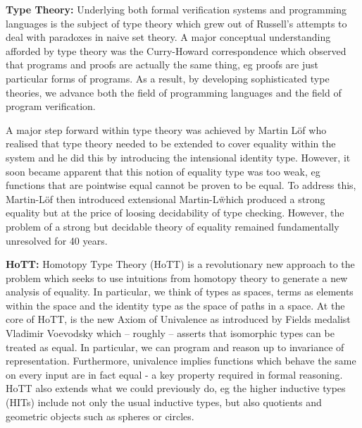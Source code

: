 \documentclass[a4paper,11pt]{article}
\begin{document}
{\bf Type Theory:} Underlying both formal verification systems and
programming languages is the subject of type theory which grew out of
Russell's attempts to deal with paradoxes in naive set theory. A major
conceptual understanding afforded by type theory was the Curry-Howard
correspondence which observed that programs and proofs are actually
the same thing, eg proofs are just particular forms of programs. As a
result, by developing sophisticated type theories, we advance both the
field of programming languages and the field of program verification.

A major step forward within type theory was achieved by Martin L\"of
who realised that type theory needed to be extended to cover equality
within the system and he did this by introducing the intensional identity type.
However, it soon became apparent that this notion of equality type was
too weak, eg functions that are pointwise equal cannot be proven to
be equal. To address this, Martin-L\"of then introduced extensional
Martin-L\" which produced a strong equality but at the price of
loosing decidability of type checking. However, the problem of a strong but
decidable theory of equality remained fundamentally unresolved for 40
years. 



{\bf HoTT:} Homotopy Type Theory (HoTT) is a revolutionary new
approach to the problem which seeks to use intuitions from homotopy
theory to generate a new analysis of equality. In particular, we think
of types as spaces, terms as elements within the space and the
identity type as the space of paths in a space. At the core of HoTT,
is the new Axiom of Univalence as introduced by Fields medalist
Vladimir Voevodsky which – roughly – asserts that isomorphic types can
be treated as equal. In particular, we can program and reason up to
invariance of representation. Furthermore, univalence implies
functions which behave the same on every input are in fact equal - a
key property required in formal reasoning. HoTT also extends what we
could previously do, eg the higher inductive types (HITs) include not
only the usual inductive types, but also quotients and geometric
objects such as spheres or circles.
\end{document}
